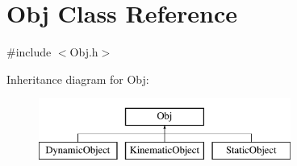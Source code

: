 \hypertarget{class_obj}{}\section{Obj Class Reference}
\label{class_obj}


{\ttfamily \#include $<$Obj.\+h$>$}

Inheritance diagram for Obj\+:\begin{figure}[H]
\begin{center}
\leavevmode
\includegraphics[height=2.000000cm]{class_obj}
\end{center}
\end{figure}
